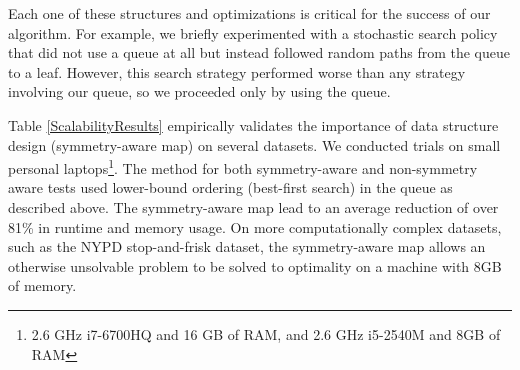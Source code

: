 \documentclass[format=sigconf]{acmart}
\begin{document}

Each one of these structures and optimizations is critical for the success of our algorithm.
For example, we briefly experimented with a stochastic search policy that did not use a queue at all but instead followed random paths from the queue to a leaf.
However, this search strategy performed worse than any strategy involving our queue, so we proceeded only by using the queue.

Table \ref{ScalabilityResults} empirically validates the importance of data structure design (symmetry-aware map) on several datasets.
We conducted trials on small personal laptops\footnote{2.6 GHz i7-6700HQ and 16 GB of RAM, and 2.6 GHz i5-2540M and 8GB of RAM}.
The method for both symmetry-aware and non-symmetry aware tests used lower-bound ordering (best-first search) in the queue as described above.
The symmetry-aware map lead to an average reduction of over 81\% in runtime and memory usage. 
On more computationally complex datasets, such as the NYPD stop-and-frisk dataset, the symmetry-aware map allows an otherwise unsolvable problem to be solved to optimality on a machine with 8GB of memory.
\end{document}
